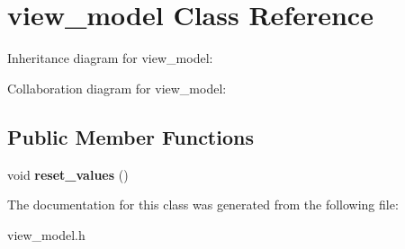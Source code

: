 \hypertarget{classview__model}{}\section{view\+\_\+model Class Reference}
\label{classview__model}


Inheritance diagram for view\+\_\+model\+:


Collaboration diagram for view\+\_\+model\+:
\subsection*{Public Member Functions}
\begin{DoxyCompactItemize}
\item 
void {\bfseries reset\+\_\+values} ()\hypertarget{classview__model_ae7f8aecbcd885a723c669ea9aa14a695}{}\label{classview__model_ae7f8aecbcd885a723c669ea9aa14a695}

\end{DoxyCompactItemize}


The documentation for this class was generated from the following file\+:\begin{DoxyCompactItemize}
\item 
view\+\_\+model.\+h\end{DoxyCompactItemize}
